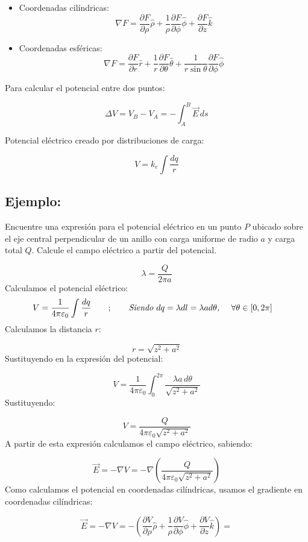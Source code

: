 \documentclass[a4paper,12pt]{article}
\begin{document}
\begin{itemize}
    \item Coordenadas cilíndricas: 
    \[
    \nabla F = \frac{\partial F}{\partial \rho}\hat{\rho} + \frac{1}{\rho}\frac{\partial F}{\partial \phi}\hat{\phi} + \frac{\partial F}{\partial z}\hat{k}
    \]
    \item Coordenadas esféricas:
    \[
    \nabla F = \frac{\partial F}{\partial r}\hat{r} + \frac{1}{r}\frac{\partial F}{\partial \theta}\hat{\theta} + \frac{1}{r\sin\theta}\frac{\partial F}{\partial \phi}\hat{\phi}
    \]
\end{itemize}

Para calcular el potencial entre dos puntos:

\[
\Delta V = V_B - V_A = - \int_{A}^{B} \vec{E}\, ds
\]

Potencial eléctrico creado por distribuciones de carga:

\[
V = k_e \int \frac{dq}{r}
\]

\subsection*{Ejemplo:}
\noindent
Encuentre una expresión para el potencial eléctrico en un punto $P$ ubicado sobre el eje central perpendicular de un anillo con carga uniforme de radio $a$ y carga total $Q$. Calcule el campo eléctrico a partir del potencial.

\[
\lambda = \frac{Q}{2\pi a}
\]
Calculamos el potencial eléctrico:
\begin{align*}
V = \frac{1}{4\pi \varepsilon_0} \int \frac{dq}{r}
& \qquad ; \qquad
\textit{Siendo $dq = \lambda dl = \lambda a d\theta$, \quad $\forall \theta \in [0,2\pi]$} 
\end{align*}
Calculamos la distancia $r$:

\[
r = \sqrt{z^2 + a^2}
\]
Sustituyendo en la expresión del potencial:

\[
V = \frac{1}{4\pi \varepsilon_0} \int_{0}^{2\pi} \frac{\lambda a\, d\theta}{\sqrt{z^2 + a^2}}
\]
Sustituyendo:

\[
V = \frac{Q}{4\pi \varepsilon_0 \sqrt{z^2 + a^2}}
\]
A partir de esta expresión calculamos el campo eléctrico, sabiendo:

\[
\vec{E} = - \nabla V = - \nabla \left( \frac{Q}{4\pi \varepsilon_0 \sqrt{z^2 + a^2}} \right)
\]
Como calculamos el potencial en coordenadas cilíndricas, usamos el gradiente en coordenadas cilíndricas:

\[
\vec{E} = - \nabla V = - \left( \frac{\partial V}{\partial \rho} \hat{\rho} + \frac{1}{\rho}\frac{\partial V}{\partial \phi}\hat{\phi} + \frac{\partial V}{\partial z}\hat{k} \right) =
\]
\end{document}
